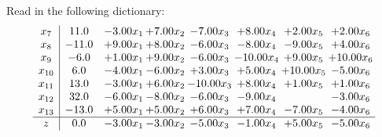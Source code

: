 \documentclass[9pt]{article}
\begin{document}
Read in the following dictionary:
\[\begin{array}{c| c c@{\hskip 2pt} c@{\hskip 2pt} c@{\hskip 2pt} c@{\hskip 2pt} c@{\hskip 2pt} c@{\hskip 2pt} }
 x_{7}   &  11.0 & -3.00 x_{1} & +  7.00 x_{2} & -7.00 x_{3} & +  8.00 x_{4} & +  2.00 x_{5} & +  2.00 x_{6}\\
 x_{8}   &  -11.0 & +  9.00 x_{1} & +  8.00 x_{2} & -6.00 x_{3} & -8.00 x_{4} & -9.00 x_{5} & +  4.00 x_{6}\\
 x_{9}   &  -6.0 & +  1.00 x_{1} & +  9.00 x_{2} & -6.00 x_{3} & -10.00 x_{4} & +  9.00 x_{5} & + 10.00 x_{6}\\
 x_{10}   &  6.0 & -4.00 x_{1} & -6.00 x_{2} & +  3.00 x_{3} & +  5.00 x_{4} & + 10.00 x_{5} & -5.00 x_{6}\\
 x_{11}   &  13.0 & -3.00 x_{1} & +  6.00 x_{2} & -10.00 x_{3} & +  8.00 x_{4} & +  1.00 x_{5} & +  1.00 x_{6}\\
 x_{12}   &  32.0 & -6.00 x_{1} & -8.00 x_{2} & -6.00 x_{3} & -9.00 x_{4} &   & -3.00 x_{6}\\
 x_{13}   &  -13.0 & +  5.00 x_{1} & +  5.00 x_{2} & +  6.00 x_{3} & +  7.00 x_{4} & -7.00 x_{5} & -4.00 x_{6}\\
\hline
z    &  0.0 & -3.00 x_{1} & -3.00 x_{2} & -5.00 x_{3} & -1.00 x_{4} & +  5.00 x_{5} & -5.00 x_{6}\\
\end{array}\]
\end{document}

